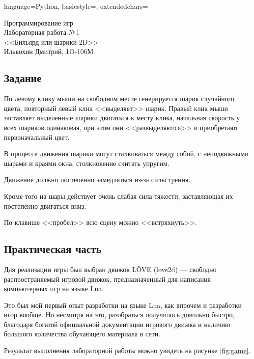 \documentclass[12pt]{article}
\newcommand{\StudentName}{Ильвохин Дмитрий}
\newcommand{\Group}{1O-106М}
\newcommand{\CourseName}{Программирование игр}
\newcommand{\LabNum}{1}
\newcommand{\Subject}{Бильярд или шарики 2D}
\begin{document}
\lstset
{
        language=Python,
        basicstyle=\footnotesize,%
        extendedchars=\true
}

\begin{flushright}
\Large{
	\CourseName \\
	Лабораторная работа №\,\LabNum \\
	<<\Subject>> \\
	\StudentName, \Group \\
}
\end{flushright}

\subsection*{Задание}
По левому клику мыши на свободном месте генерируется шарик случайного цвета,
повторный левый клик <<выделяет>> шарик. Правый клик мыши заставляет выделенные
шарики двигаться к месту клика, начальная скорость у всех шариков одинаковая,
при этом они <<развыделяются>> и приобретают первоначальный цвет.

В процессе движения шарики могут сталкиваться между собой, с неподвижными шарами
и краями окна, столкновение считать упругим.

Движение должно постепенно замедляться из-за силы трения.

Кроме того на шары действует очень слабая сила тяжести, заставляющая
их постепенно двигаться вниз.

По клавише <<пробел>> всю сцену можно <<встряхнуть>>.

\subsection*{Практическая часть}
Для реализации игры был выбран движок LÖVE (love2d) --- свободно распространяемый игровой движок,
предназначенный для написания компьютерных игр на языке Lua.

Это был мой первый опыт разработки на языке Lua, как впрочем и разработки
игор вообще. Но несмотря на это, разобраться получилось довольно быстро,
благодаря богатой официальной документации игрового движка и наличию
большого количества обучающего материала в сети.

Результат выполнения лабораторной работы можно увидеть на рисунке \ref{fig:game}.
\end{document}
